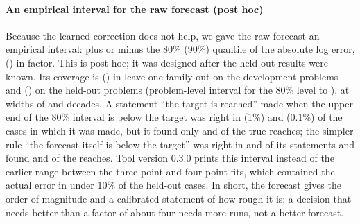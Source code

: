 \paragraph{An empirical interval for the raw forecast (post hoc)} Because the learned correction does not help, we gave the raw forecast an empirical interval: plus or minus the 80\% (90\%) quantile of the absolute log error, \SfPhFEighty{} (\SfPhFNinety) in factor. This is post hoc; it was designed after the held-out results were known. Its coverage is \SfPhDevCovEighty{} (\SfPhDevCovNinety) in leave-one-family-out on the development problems and \SfPhHeldCovEighty{} (\SfPhHeldCovNinety) on the held-out problems (problem-level interval for the 80\% level \SfPhHeldLo{} to \SfPhHeldHi), at widths of \SfPhWEighty{} and \SfPhWNinety{} decades. A statement ``the target is reached'' made when the upper end of the 80\% interval is below the target was right in \SfDecOnePrec{} (1\%) and \SfDecTenthPrec{} (0.1\%) of the cases in which it was made, but it found only \SfDecOneRec{} and \SfDecTenthRec{} of the true reaches; the simpler rule ``the forecast itself is below the target'' was right in \SfDecOnePprec{} and \SfDecTenthPprec{} of its statements and found \SfDecOnePrecRec{} and \SfDecTenthPrecRec{} of the reaches. Tool version 0.3.0 prints this interval instead of the earlier range between the three-point and four-point fits, which contained the actual error in under 10\% of the held-out cases. In short, the forecast gives the order of magnitude and a calibrated statement of how rough it is; a decision that needs better than a factor of about four needs more runs, not a better forecast.
